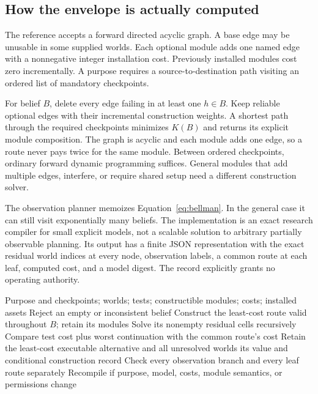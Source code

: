 \documentclass[11pt,letterpaper]{article}
\theoremstyle{remark}\newtheorem{remark}{Remark}[section]
\begin{document}
\subsection{How the envelope is actually computed}
The reference accepts a forward directed acyclic graph. A base edge may be unusable in some supplied worlds. Each optional module adds one named edge with a nonnegative integer installation cost. Previously installed modules cost zero incrementally. A purpose requires a source-to-destination path visiting an ordered list of mandatory checkpoints.

For belief $B$, delete every edge failing in at least one $h\in B$. Keep reliable optional edges with their incremental construction weights. A shortest path through the required checkpoints minimizes $K(B)$ and returns its explicit module composition. The graph is acyclic and each module adds one edge, so a route never pays twice for the same module. Between ordered checkpoints, ordinary forward dynamic programming suffices. General modules that add multiple edges, interfere, or require shared setup need a different construction solver.

The observation planner memoizes Equation~\eqref{eq:bellman}. In the general case it can still visit exponentially many beliefs. The implementation is an exact research compiler for small explicit models, not a scalable solution to arbitrary partially observable planning. Its output has a finite JSON representation with the exact residual world indices at every node, observation labels, a common route at each leaf, computed cost, and a model digest. The record explicitly grants no operating authority.

\begin{algorithm}[htbp]\small
\caption{Out-Strategise: exact reference construction}\label{alg:main}
\begin{algorithmic}[1]
\Require Purpose and checkpoints; worlds; tests; constructible modules; costs; installed assets
  \State Reject an empty or inconsistent belief
  \State Construct the least-cost route valid throughout $B$; retain its modules
    \State Solve its nonempty residual cells recursively
    \State Compare test cost plus worst continuation with the common route's cost
  \EndFor
  \State Retain the least-cost executable alternative and all unresolved worlds
  \State \Return its value and conditional construction record
\EndFunction
\State Check every observation branch and every leaf route separately
\State Recompile if purpose, model, costs, module semantics, or permissions change
\end{algorithmic}
\end{algorithm}
\end{document}
